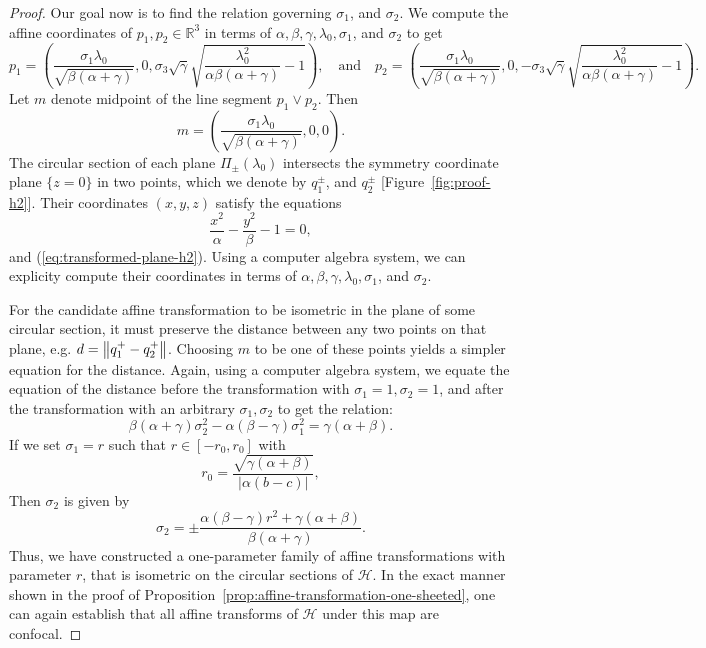 \documentclass[10pt, a4paper]{article}
\theoremstyle{BoldTopSpacing}
\theoremstyle{BoldTopSpacing}
\theoremstyle{BoldTopSpacing}
\theoremstyle{BoldTopBottomSpacing}
\theoremstyle{BoldTopSpacing}
\theoremstyle{BoldTopBottomSpacing}
\theoremstyle{remark}
\begin{document}
\begin{proof}
Our goal now is to find the relation governing $\sigma_{1}$, and $\sigma_{2}$. We compute the affine coordinates of $p_{1}, p_2 \in \mathbb{R}^3$ in terms of $\alpha, \beta, \gamma, \lambda_{0}, \sigma_{1}$, and $\sigma_2$ to get
\[
p_{1} = \left( \frac{\sigma_{1} \lambda_{0}}{\sqrt{\beta (\alpha + \gamma)}}, 0, \sigma_{3} \sqrt{\gamma} \sqrt{ \frac{\lambda^2_{0}}{\alpha \beta (\alpha + \gamma)} - 1 } \right), \quad \text{and} \quad p_{2} = \left( \frac{\sigma_{1} \lambda_{0}}{\sqrt{\beta (\alpha + \gamma)}}, 0, -\sigma_{3} \sqrt{\gamma} \sqrt{ \frac{\lambda^2_{0}}{\alpha \beta (\alpha + \gamma)} - 1 } \right).
\]
Let $m$ denote midpoint of the line segment $p_{1} \vee p_{2}$. Then
\[
    m = \left( \frac{\sigma_{1} \lambda_{0}}{\sqrt{\beta (\alpha + \gamma)}}, 0, 0 \right).
\]
The circular section of each plane $\Pi_{\pm}\left(\lambda_{0}\right)$ intersects the symmetry coordinate plane $\{z = 0\}$ in two points, which we denote by $q^{\pm}_{1}$, and $q^{\pm}_{2}$ [Figure~\ref{fig:proof-h2}]. Their coordinates $(x, y, z)$ satisfy the equations
\[
    \frac{x^2}{\alpha} - \frac{y^2}{\beta} - 1 = 0,
\]
and (\ref{eq:transformed-plane-h2}). Using a computer algebra system, we can explicity compute their coordinates in terms of $\alpha, \beta, \gamma, \lambda_{0}, \sigma_{1}$, and $\sigma_2$. \par
For the candidate affine transformation to be isometric in the plane of some circular section, it must preserve the distance between any two points on that plane, e.g. $d = \norm{q^{+}_{1} - q^{+}_{2}}$. Choosing $m$ to be one of these points yields a simpler equation for the distance. Again, using a computer algebra system, we equate the equation of the distance before the transformation with $\sigma_{1} = 1, \sigma_{2} = 1$, and after the transformation with an arbitrary $\sigma_{1}, \sigma_{2}$ to get the relation:
\begin{equation}
    \beta (\alpha + \gamma) \sigma_{2}^2 - \alpha (\beta - \gamma) \sigma_{1}^2 = \gamma (\alpha + \beta).
\end{equation}
If we set $\sigma_{1} = r$ such that $r \in [-r_0, r_0]$ with
\[
    r_{0} = \frac{\sqrt{\gamma (\alpha + \beta)}}{\lvert \alpha (b - c) \rvert },
\]
Then $\sigma_2$ is given by
\[
    \sigma_{2} = \pm \frac{\alpha (\beta - \gamma) r^2 + \gamma (\alpha + \beta)}{\beta (\alpha + \gamma)}.
\]
Thus, we have constructed a one-parameter family of affine transformations with parameter $r$, that is isometric on the circular sections of $\mathcal{H}$. In the exact manner shown in the proof of Proposition~\ref{prop:affine-transformation-one-sheeted}, one can again establish that all affine transforms of $\mathcal{H}$ under this map are confocal.
\end{proof}
\end{document}
